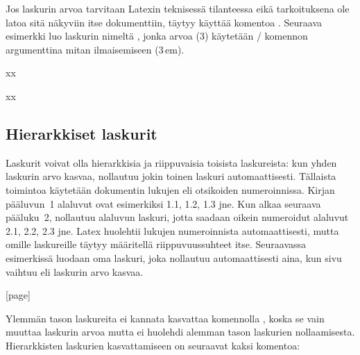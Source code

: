 Jos laskurin arvoa tarvitaan Latexin teknisessä tilanteessa eikä
tarkoituksena ole latoa sitä näkyviin itse dokumenttiin, täytyy käyttää
komentoa . Seuraava esimerkki luo laskurin nimeltä
, jonka arvoa (3) käytetään \-/ komennon
argumenttina mitan ilmaisemiseen (3\,em).

\begin{koodilohkosis}
\setcounter{mitta}{3}
xx
\end{koodilohkosis}

\begin{tulossis}
  x\hspace{3em}x
\end{tulossis}

\subsection{Hierarkkiset laskurit}

Laskurit voivat olla hierarkkisia ja riippuvaisia toisista laskureista:
kun yhden laskurin arvo kasvaa, nollautuu jokin toinen laskuri
automaattisesti. Tällaista toimintoa käytetään dokumentin lukujen eli
otsikoiden numeroinnissa. Kirjan pääluvun~1 alaluvut ovat esimerkiksi
1.1, 1.2, 1.3 jne. Kun alkaa seuraava pääluku~2, nollautuu alaluvun
laskuri, jotta saadaan oikein numeroidut alaluvut 2.1, 2.2, 2.3 jne.
Latex huolehtii lukujen numeroinnista automaattisesti, mutta omille
laskureille täytyy määritellä riippuvuussuhteet itse. Seuraavassa
esimerkissä luodaan oma laskuri, joka nollautuu automaattisesti aina,
kun sivu vaihtuu eli laskurin  arvo kasvaa.

\begin{koodilohkosis}
[page]
\end{koodilohkosis}

Ylemmän tason laskureita ei kannata kasvattaa komennolla
, koska se vain muuttaa laskurin arvoa mutta ei
huolehdi alemman tason laskurien nollaamisesta. Hierarkkisten laskurien
kasvattamiseen on seuraavat kaksi komentoa:

\begin{koodilohkosis}
\end{koodilohkosis}

